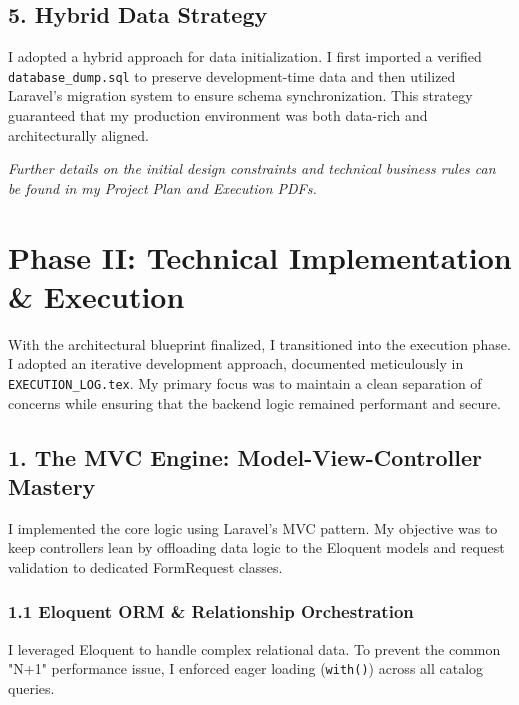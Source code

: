 \documentclass[12pt,a4paper]{article}
\begin{document}
\subsection{5. Hybrid Data Strategy}
I adopted a hybrid approach for data initialization. I first imported a verified \texttt{database\_dump.sql} to preserve development-time data and then utilized Laravel's migration system to ensure schema synchronization. This strategy guaranteed that my production environment was both data-rich and architecturally aligned.

\vfill
\begin{center}
    \textit{Further details on the initial design constraints and technical business rules can be found in my Project Plan and Execution PDFs.}
\end{center}

\newpage
\section{Phase II: Technical Implementation \& Execution}

With the architectural blueprint finalized, I transitioned into the execution phase. I adopted an iterative development approach, documented meticulously in \texttt{EXECUTION\_LOG.tex}. My primary focus was to maintain a clean separation of concerns while ensuring that the backend logic remained performant and secure.

\subsection{1. The MVC Engine: Model-View-Controller Mastery}
I implemented the core logic using Laravel’s MVC pattern. My objective was to keep controllers lean by offloading data logic to the Eloquent models and request validation to dedicated FormRequest classes.

\subsubsection{1.1 Eloquent ORM \& Relationship Orchestration}
I leveraged Eloquent to handle complex relational data. To prevent the common "N+1" performance issue, I enforced eager loading (\texttt{with()}) across all catalog queries.
\end{document}
